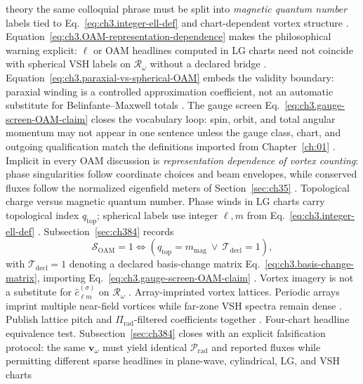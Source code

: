 theory the same colloquial phrase must be split into \emph{magnetic quantum number} labels tied to
Eq.~\eqref{eq:ch3.integer-ell-def} and chart-dependent vortex structure \cite{allen1992}.
Equation~\eqref{eq:ch3.OAM-representation-dependence} makes the philosophical warning explicit: \(\ell\) or OAM
headlines computed in LG charts need not coincide with spherical VSH labels on \(\mathcal{R}_\omega\) without a
declared bridge \cite{allen1992}. Equation~\eqref{eq:ch3.paraxial-vs-spherical-OAM} embeds the
validity boundary: paraxial winding is a controlled approximation coefficient, not an automatic substitute for
Belinfante--Maxwell totals \cite{belinfante1940}. The gauge screen
Eq.~\eqref{eq:ch3.gauge-screen-OAM-claim} closes the vocabulary loop: spin, orbit, and total angular momentum may not
appear in one sentence unless the gauge class, chart, and outgoing qualification match the definitions imported from
Chapter~\ref{ch:01} \cite{belinfante1940}. Implicit in every OAM discussion is \emph{representation
dependence of vortex counting}: phase singularities follow coordinate choices and beam envelopes, while conserved
fluxes follow the normalized eigenfield meters of Section~\ref{sec:ch35} \cite{harrington2001}.
Topological charge versus magnetic quantum number. Phase winds in LG charts carry topological index \(q_{\mathrm{top}}\); spherical labels use integer \(\ell,m\) from Eq.~\eqref{eq:ch3.integer-ell-def} \cite{allen1992}. Subsection~\ref{sec:ch384} records
\begin{equation}
\label{eq:ch3.topological-vs-magnetic-index}
\mathcal{S}_{\mathrm{OAM}}=1
\iff
\left(q_{\mathrm{top}}=m_{\mathrm{mag}}\ \vee\ \mathcal{T}_{\mathrm{decl}}=1\right),
\end{equation}
with \(\mathcal{T}_{\mathrm{decl}}=1\) denoting a declared basis-change matrix Eq.~\eqref{eq:ch3.basis-change-matrix}, importing Eq.~\eqref{eq:ch3.gauge-screen-OAM-claim} \cite{belinfante1940}. Vortex imagery is not a substitute for \(\widehat{c}_{\ell m}^{(\sigma)}\) on \(\mathcal{R}_\omega\) \cite{hansen1988}.
Array-imprinted vortex lattices. Periodic arrays imprint multiple near-field vortices while far-zone VSH spectra remain dense \cite{jackson1999}. Publish lattice pitch and \(\Pi_{\mathrm{rad}}\)-filtered coefficients together \cite{hansen1988}.
Four-chart headline equivalence test. Subsection~\ref{sec:ch384} closes with an explicit falsification protocol: the same \(\mathbf{v}_\omega\) must yield identical \(\mathcal{P}_{\mathrm{rad}}\) and reported fluxes while permitting different sparse headlines in plane-wave, cylindrical, LG, and VSH charts
